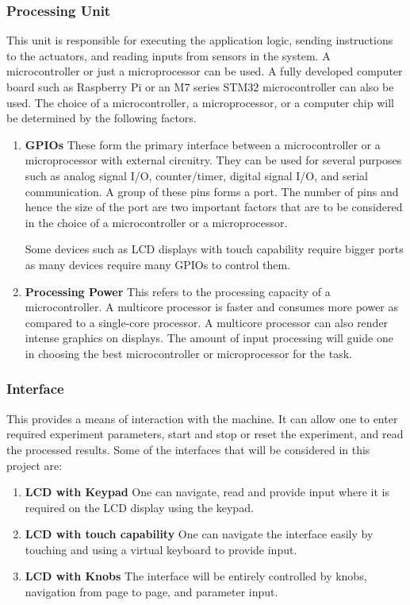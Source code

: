 \subsubsection{Processing Unit}
This unit is responsible for executing the application logic, sending instructions to the actuators, and reading inputs from sensors in the system. A microcontroller or just a microprocessor can be used. A fully developed computer board such as Raspberry Pi or an M7 series \ac{STM}32 microcontroller can also be used. The choice of a microcontroller, a microprocessor, or a computer chip will be determined by the following factors. 
\begin{enumerate}
    \item \textbf{\ac{GPIO}s} \newline
    These form the primary interface between a microcontroller or a microprocessor with external circuitry. They can be used for several purposes such as analog signal I/O, counter/timer, digital signal I/O, and serial communication. A group of these pins forms a port. The number of pins and hence the size of the port are two important factors that are to be considered in the choice of a microcontroller or a microprocessor. 
    \par
    Some devices such as LCD displays with touch capability require bigger ports as many devices require many GPIOs to control them. 
    \item \textbf{Processing Power}  \newline
    This refers to the processing capacity of a microcontroller. A multicore processor is faster and consumes more power as compared to a single-core processor. A multicore processor can also render intense graphics on displays. The amount of input processing will guide one in choosing the best microcontroller or microprocessor for the task.
\end{enumerate}
\subsubsection{Interface}
This provides a means of interaction with the machine. It can allow one to enter required experiment parameters, start and stop or reset the experiment, and read the processed results. Some of the interfaces that will be considered in this project are:
\begin{enumerate}
    \item \textbf{LCD with Keypad} \newline
    One can navigate, read and provide input where it is required on the LCD display using the keypad. 
    \item \textbf{LCD with touch capability} \newline
    One can navigate the interface easily by touching and using a virtual keyboard to provide input.
    \item \textbf{LCD with Knobs} \newline
    The interface will be entirely controlled by knobs, navigation from page to page, and parameter input.
\end{enumerate}

